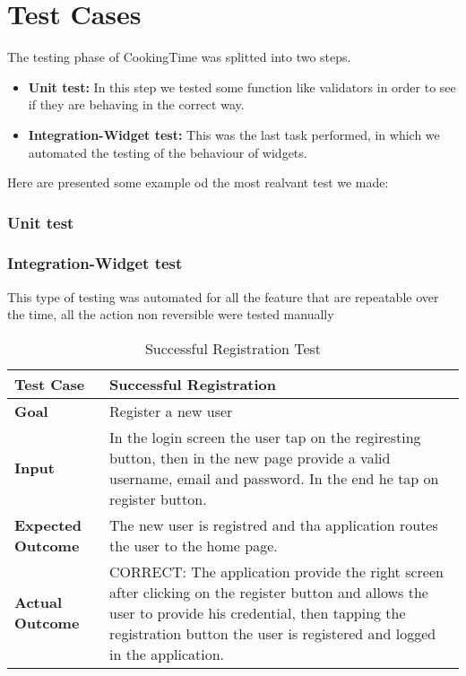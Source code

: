 \chapter{Test Cases}
The testing phase of CookingTime was splitted into two steps.

\begin{itemize}
	\item \textbf{Unit test:} In this step we tested some function like validators in order to see if they are behaving in the correct way.
	\item \textbf{Integration-Widget test:} This was the last task performed, in which we automated the testing of the behaviour of widgets.
\end{itemize}

Here are presented some example od the most realvant test we made:

\subsection{Unit test}

\subsection{Integration-Widget test}
This type of testing was automated for all the feature that are repeatable over the time, all the action non reversible were tested manually

\begin{table}[H]
	\centering
	\begin{tabular}{ll}
	\hline
	\textbf{Test Case}& Successful Registration\\
	\hline
	\textbf{Goal}& Register a new user\\
	\hline
	\textbf{Input}& In the login screen the user tap on the regiresting button, then in the new page provide a valid username, email and password. In the end he tap on register button.\\
	\hline
	\textbf{Expected Outcome}& The new user is registred and tha application routes the user to the home page.\\
	\hline
	\textbf{Actual Outcome}& CORRECT: The application provide the right screen after clicking on the register button and allows the user to provide his credential, then tapping the registration button the user is registered and logged in the application.\\
	\hline	
	\end{tabular}
	\caption{Successful Registration Test}
\end{table}

